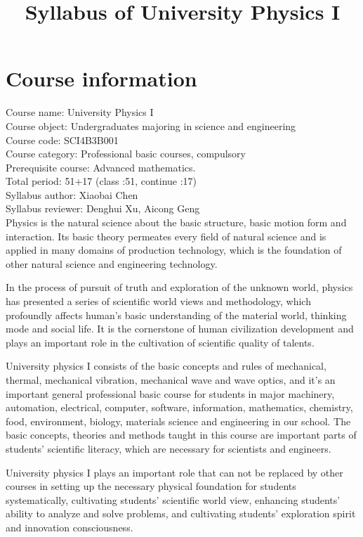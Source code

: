 \documentclass[10pt,a4paper,oneside]{article}
\date{}
\begin{document}
\title{\vspace{-3em}Syllabus of University Physics I\vspace{-2em}}
\maketitle 
\section{Course information}
Course name: University Physics I \\
Course object: Undergraduates majoring in science and engineering\\
Course code: SCI4B3B001\\
Course category: Professional basic courses, compulsory\\
Prerequisite course: Advanced mathematics.\\
Total  period: 51+17 (class :51, continue :17)\\
Syllabus author: Xiaobai Chen\\
Syllabus reviewer: Denghui Xu, Aicong Geng\\


Physics is the natural science about the basic structure, basic motion form and interaction. Its basic theory permeates every field of natural science and is applied in many domains of production technology, which is the foundation of other natural science and engineering technology.

In the process of pursuit of truth and exploration of the unknown world, physics has presented a series of scientific world views and methodology, which profoundly affects human's basic understanding of the material world, thinking mode and social life. It is the cornerstone of human civilization development and plays an important role in the cultivation of scientific quality of talents.

University physics I consists of the basic concepts and rules of mechanical, thermal, mechanical vibration, mechanical wave and wave optics, and it's an important general professional basic course for students in major machinery, automation, electrical, computer, software, information, mathematics, chemistry, food, environment, biology, materials science and engineering in our school. The basic concepts, theories and methods taught in this course are important parts of students' scientific literacy, which are necessary for scientists and engineers.

University physics I plays an important role that can not be replaced by other courses in setting up the necessary physical foundation for students systematically, cultivating students' scientific world view, enhancing students' ability to analyze and solve problems, and cultivating students' exploration spirit and innovation consciousness.
\end{document}
